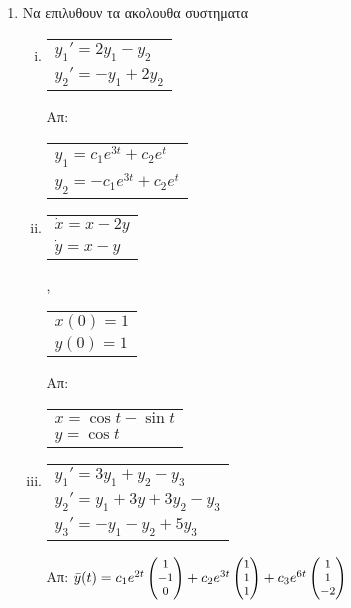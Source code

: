 





\begin{center}
  \minibox{\large\bfseries \textcolor{Col1}{Ασκήσεις στα Συστηματα ΣΔΕ (Μεθοδος
  Ιδιοτιμων)}}
\end{center}

\vspace{\baselineskip}

\begin{enumerate}

\item Να επιλυθουν τα ακολουθα συστηματα

\begin{enumerate}[i)]
\item \begin{tabular}{l} $y_1'=2y_1-y_2$ \\ $y_2'=-y_1+2y_2$\end{tabular} \hfill Απ: \begin{tabular}{l} $y_1=c_1e^{3t}+c_2e^t$ \\ $y_2=-c_1e^{3t}+c_2e^t$\end{tabular}


\item \begin{tabular}{l} $\dot x=x-2y$ \\ $\dot y=x-y$\end{tabular}, \begin{tabular}{l} $x(0)=1$ \\ $y(0)=1$\end{tabular}\hfill Απ:  \begin{tabular}{l} $x=\cos t-\sin t$ \\ $y=\cos t$\end{tabular}

\item  \begin{tabular}{l} $y_1'=3y_1+y_2-y_3$ \\ $y_2'=y_1+3y+3y_2-y_3$ \\ $y_3'=-y_1-y_2+5y_3$\end{tabular}\hfill Απ: $\footnotesize{\bar{y}(t)=c_1e^{2t}\begin{pmatrix}
1\\-1\\0
\end{pmatrix}+c_2e^{3t}\begin{pmatrix}
1\\1\\1
\end{pmatrix}+c_3e^{6t}\begin{pmatrix}
1\\1\\-2
\end{pmatrix}}$


\end{enumerate}
\end{enumerate}
